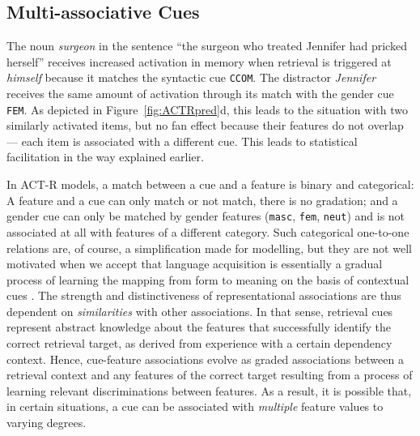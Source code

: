 \documentclass{cambridge7A}\usepackage[]{graphicx}\usepackage[]{color}
\newcommand{\actrcue}[1]{\texttt{\uppercase{#1}}}
\begin{document}
\subsection{Multi-associative Cues}
\label{sec:cueconf}
The noun \textit{surgeon} in the sentence ``the surgeon who treated Jennifer had pricked herself'' receives increased activation in memory when retrieval is triggered at \textit{himself} because it matches the syntactic cue \actrcue{CCOM}.
The distractor \textit{Jennifer} receives the same amount of activation through its match with the gender cue \actrcue{FEM}. As depicted in Figure~\ref{fig:ACTRpred}d, this leads to the situation with two similarly activated items, but no fan effect because their features do not overlap --- each item is associated with a different cue.
This leads to statistical facilitation in the way explained earlier.

In ACT-R models, a match between a cue and a feature is  binary and  categorical: A feature and a cue can only match or not match, there is no gradation; and a gender cue can only be matched by gender features (\texttt{masc}, \texttt{fem}, \texttt{neut}) and is not associated at all with features of a different category.
Such categorical one-to-one relations are, of course, a simplification made for modelling, but they are not well motivated when we accept that language acquisition is essentially a gradual process of learning the mapping from form to meaning on the basis of contextual cues \citep[see, e.g.,][]{bybee2006usage,langacker1987foundations,tomasello2003constructing}. The strength and distinctiveness of representational associations are thus dependent on \emph{similarities} with other associations.
In that sense, retrieval cues represent abstract knowledge about the features that successfully identify the correct retrieval target, as derived from experience with a certain dependency context. Hence, cue-feature associations evolve as graded associations between a retrieval context and any features of the correct target resulting from a process of learning relevant discriminations between features. 
As a result, it is possible that, in certain situations, a cue can be associated with \emph{multiple} feature values to varying degrees. 
\end{document}
